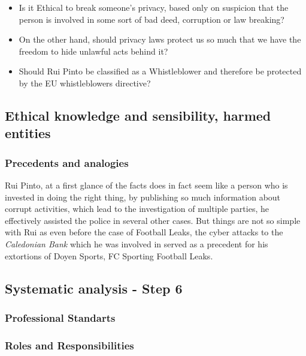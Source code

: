 \begin{itemize}
    \item Is it Ethical to break someone's privacy, based only on suspicion that the person is involved in some sort of bad deed, corruption or law breaking?
    \item On the other hand, should privacy laws protect us so much that we have the freedom to hide unlawful acts behind it?
    \item Should Rui Pinto be classified as a Whistleblower and therefore be protected by the EU whistleblowers directive?
\end{itemize}

\subsection{Ethical knowledge and sensibility, harmed entities}
\subsubsection{Precedents and analogies}
Rui Pinto, at a first glance of the facts does in fact seem like a person who is invested in doing the right thing, by publishing so much information about corrupt activities, which lead to the investigation of multiple parties, he effectively assisted the police in several other cases.
But things are not so simple with Rui as even before the case of Football Leaks, the cyber attacks to the \textit{Caledonian Bank} which he was involved in served as a precedent for his extortions of Doyen Sports, FC Sporting  Football Leaks.




\subsection{Systematic analysis - Step 6}

\subsubsection{Professional Standarts}

\subsubsection{Roles and Responsibilities}

